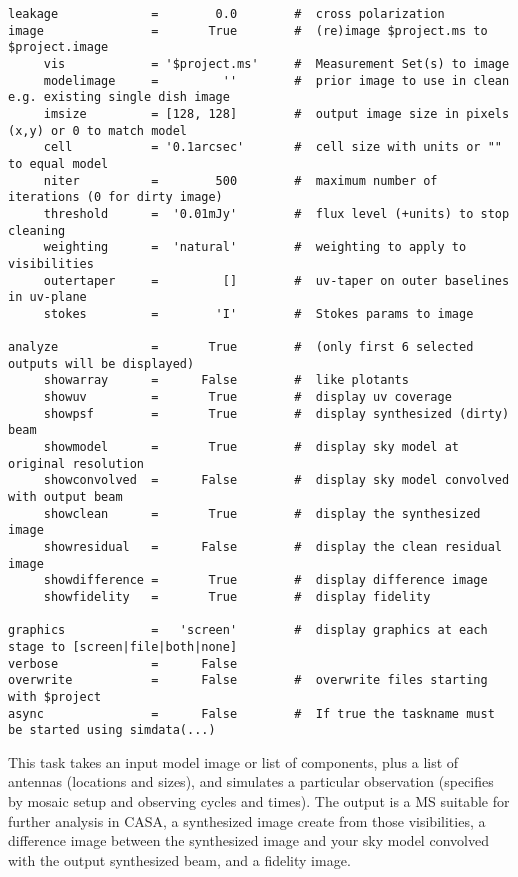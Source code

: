 \begin{verbatim}
leakage             =        0.0        #  cross polarization
image               =       True        #  (re)image $project.ms to $project.image
     vis            = '$project.ms'     #  Measurement Set(s) to image
     modelimage     =         ''        #  prior image to use in clean e.g. existing single dish image
     imsize         = [128, 128]        #  output image size in pixels (x,y) or 0 to match model
     cell           = '0.1arcsec'       #  cell size with units or "" to equal model
     niter          =        500        #  maximum number of iterations (0 for dirty image)
     threshold      =  '0.01mJy'        #  flux level (+units) to stop cleaning
     weighting      =  'natural'        #  weighting to apply to visibilities
     outertaper     =         []        #  uv-taper on outer baselines in uv-plane
     stokes         =        'I'        #  Stokes params to image

analyze             =       True        #  (only first 6 selected outputs will be displayed)
     showarray      =      False        #  like plotants
     showuv         =       True        #  display uv coverage
     showpsf        =       True        #  display synthesized (dirty) beam
     showmodel      =       True        #  display sky model at original resolution
     showconvolved  =      False        #  display sky model convolved with output beam
     showclean      =       True        #  display the synthesized image
     showresidual   =      False        #  display the clean residual image
     showdifference =       True        #  display difference image
     showfidelity   =       True        #  display fidelity

graphics            =   'screen'        #  display graphics at each stage to [screen|file|both|none]
verbose             =      False        
overwrite           =      False        #  overwrite files starting with $project
async               =      False        #  If true the taskname must be started using simdata(...)
\end{verbatim}
\normalsize

This task takes an input model image or list of components, plus a
list of antennas (locations and sizes), and simulates a particular
observation (specifies by mosaic setup and observing cycles and
times).  The output is a MS suitable for further analysis in CASA, a
synthesized image create from those visibilities, a difference image
between the synthesized image and your sky model convolved with the
output synthesized beam, and a fidelity image.

